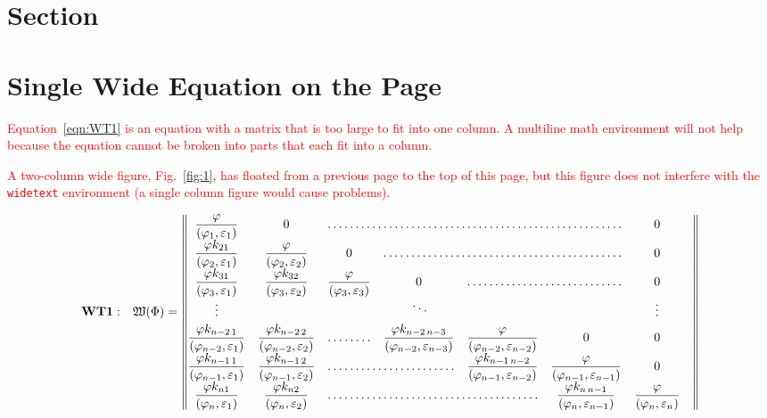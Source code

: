 \lipsum[5-8]
\section{Section}
\lipsum[9-12]

\section{Single Wide Equation on the Page}

\textcolor{red}{Equation~\eqref{eqn:WT1} is an equation with a matrix that is too large to fit into one column. A multiline math environment will not help because the equation cannot be broken into parts that each fit into a column.}  

\textcolor{red}{A two-column wide figure, Fig.~\ref{fig:1}, has floated from a previous page to the top of this page, but this figure does not interfere with the \texttt{widetext} environment (a single column figure would cause problems).}

\begin{widetext}
\begin{equation}\label{eqn:WT1}
\mathbf{WT1:}\quad
\mathfrak{W}(\bm{\Phi})= \begin{Vmatrix}
\dfrac\varphi{(\varphi_1,\varepsilon_1)}			& 0 												& \hdotsfor{4} 	& 0 			&	\\[\jot]
\dfrac{\varphi k_{21}}{(\varphi_2,\varepsilon_1)}	& \dfrac\varphi{(\varphi_2,\varepsilon_2)}			& 0 			& \hdotsfor{3} 	& 0 \\[\jot]
\dfrac{\varphi k_{31}}{(\varphi_3,\varepsilon_1)}	&\dfrac{\varphi k_{32}}{(\varphi_3,\varepsilon_2)}	& \dfrac\varphi{(\varphi_3,\varepsilon_3)}& 0 & \hdotsfor{2} & 0 \\[\jot]
\vdots 	&  &  & \smash{\rotatebox{15}{$\ddots$}} &  & & \vdots \\[\jot]
\dfrac{\varphi k_{n-2\, 1}}{(\varphi_{n-2},\varepsilon_1)}	&
\dfrac{\varphi k_{n-2\, 2}}{(\varphi_{n-2},\varepsilon_2)}	&\hdotsfor{1} & \dfrac{\varphi k_{n-2\,n-3}}{(\varphi_{n-2},\varepsilon_{n-3})} & \dfrac\varphi{(\varphi_{n-2},\varepsilon_{n-2})}& 0& 0 \\[\jot]
\dfrac{\varphi k_{n-1\, 1}}{(\varphi_{n-1},\varepsilon_1)}	& \dfrac{\varphi k_{n-1\, 2}}{(\varphi_{n-1},\varepsilon_2)} &\hdotsfor{2} & 
\dfrac{\varphi k_{n-1\,n-2}}{(\varphi_{n-1},\varepsilon_{n-2})}& \dfrac{\varphi}{(\varphi_{n-1},\varepsilon_{n-1})} & 0 \\[\jot]
\dfrac{\varphi k_{n1}}{(\varphi_n,\varepsilon_1)}	& \dfrac{\varphi k_{n2}}{(\varphi_n,\varepsilon_2)}	& \hdotsfor{3}	&
\dfrac{\varphi k_{n\,n-1}}{(\varphi_n,\varepsilon_{n-1})} & \dfrac{\varphi}{(\varphi_n,\varepsilon_n)}
\end{Vmatrix}
\end{equation}
\end{widetext}

